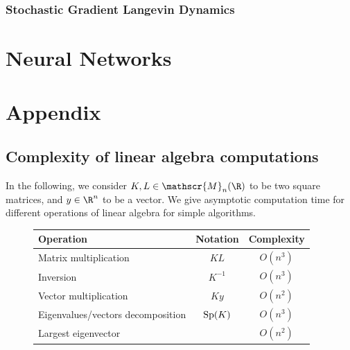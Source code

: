 \documentclass[toc, titlepaged]{../cs-classes/cs-classes}
\begin{document}
\subsubsection{Stochastic Gradient Langevin Dynamics}

\section{Neural Networks}

\section{Appendix}
\subsection{Complexity of linear algebra computations}
In the following, we consider $K, L\in\mathscr{M}_n(\R)$ to be two square matrices, and $y\in\R^n$ to be a vector. We give asymptotic computation time for different operations of linear algebra for simple algorithms.

\begin{figure}[H]
    \centering
    \begin{tabular}{|l|c|c|}
        \hline
        \bf Operation & \bf Notation & \bf Complexity\\
        \hline\hline
        Matrix multiplication & $KL$ & $O(n^3)$\\\hline
        Inversion & $K^{-1}$ & $O(n^3)$\\\hline
        Vector multiplication & $Ky$ & $O(n^2)$\\\hline
        Eigenvalues/vectors decomposition & $\textnormal{Sp}(K)$ & $O(n^3)$\\\hline
        Largest eigenvector & & $O(n^2)$\\\hline
    \end{tabular}
\end{figure}
\end{document}
